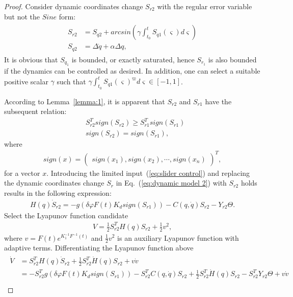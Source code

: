 \documentclass[Journal,letterpaper]{ascelike-new}
\theoremstyle{plain}
\theoremstyle{remark}
\begin{document}
\begin{proof}
Consider dynamic coordinates change $S_{r2}$ with the regular error variable but not the $Sine$ form:
\begin{align}
\begin{split}
S_{r2} &= S_{q2}+arcsin(\gamma\int^t_{t_0}S_{q1}(\varsigma) d\varsigma)\\
S_{q2} &= \Delta \dot q+\alpha \Delta q,
\end{split}
\end{align}
It is obvious that $S_{q_1}$ is bounded, or exactly saturated, hence $S_{r_1}$ is also bounded if the dynamics can be controlled as desired. In addition, one can select a suitable positive scalar $\gamma$ such that $\gamma\int^t_{t_0}S_{q1}(\varsigma)^\varpi d\varsigma\in[-1,1]$.\par
According to Lemma~\ref{lemma:1}, it is apparent that $S_{r2}$ and $S_{r1}$ have the subsequent relation:
\begin{align}
&S_{r2}^T sign(S_{r2}) \ge  S_{r1}^T sign(S_{r1})\\
&sign(S_{r2})=sign(S_{r1}),
\end{align}
where
\begin{align}
sign(x) = \begin{pmatrix}sign(x_1),sign(x_2),\cdots,sign(x_n)\end{pmatrix}^T,
\end{align}
for a vector $x$. Introducing the limited input~(\ref{eq:slider control}) and replacing the dynamic coordinates change $S_r$ in Eq.~(\ref{eq:dynamic model 2}) with $S_{r2}$ holds results in the following expression:
\begin{align}
H(q)\dot S_{r2} = -g(\delta\varphi F(t) K_dsign(S_{r1}))-C(q,\dot q)S_{r2}-Y_{r2}\Theta.
\end{align}
Select the Lyapunov function candidate
\begin{align}
V=\frac{1}{2}S_{r2}^TH(q)S_{r2}+\frac{1}{2}v^2,
\end{align}
where $v=F(t)e^{K_1^{-1}F^{-1}(t)}$ and $\frac{1}{2}v^2$ is an auxiliary Lyapunov function with adaptive terms. Differentiating the Lyapunov function above
\begin{align}
\begin{split}
\dot V &= S_{r2}^TH(q)\dot S_{r2}+\frac{1}{2}S_{r2}^T\dot H(q)S_{r2}+v\dot v\\
&= -S_{r2}^Tg(\delta\varphi F(t) K_dsign(S_{r1}))-S_{r2}^TC(q,\dot q)S_{r2}+\frac{1}{2}S_{r2}^T\dot H(q)S_{r2}-S_{r2}^TY_{r2}\Theta+v\dot v\\

\end{split}
\end{align}
\end{proof}
\end{document}

